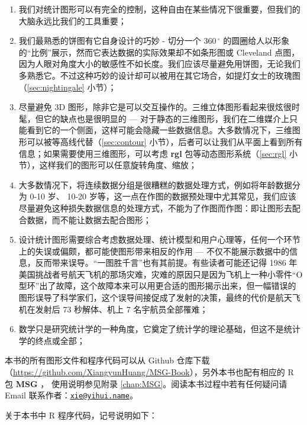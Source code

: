 \documentclass[
  b5paper,
  UTF8,twoside]{book}
\begin{document}
\begin{enumerate}
\def\labelenumi{\arabic{enumi}.}
\item
  我们对统计图形可以有完全的控制，这种自由在某些情况下很重要，但我们的大脑永远比我们的工具重要；
\item
  我们最熟悉的饼图有它自身设计的巧妙 - 切分一个 \(360\,^{\circ}\) 的圆圈给人以形象的``比例''展示，然而它表达数据的实际效果却不如条形图或 Cleveland 点图，因为人眼对角度大小的敏感性不如长度。我们应该尽量避免用饼图，无论我们多熟悉它。不过这种巧妙的设计却可以被用在其它场合，如提灯女士的玫瑰图（\ref{sec:nightingale} 小节）；
\item
  尽量避免 3D 图形，除非它是可以交互操作的。三维立体图形看起来很炫很时髦，但它的缺点也是很明显的 --- 对于静态的三维图形，我们在二维媒介上只能看到它的一个侧面，这样可能会隐藏一些数据信息。大多数情况下，三维图形可以被等高线代替（\ref{sec:contour} 小节），后者可以让我们从平面上看到所有信息；如果需要使用三维图形，可以考虑 \textbf{rgl} 包等动态图形系统（\ref{sec:rgl} 小节），这样我们的图形可以任意旋转角度、缩放；
\item
  大多数情况下，将连续数据分组是很糟糕的数据处理方式，例如将年龄数据分为 0-10 岁、 10-20 岁等，这一点在作图的数据预处理中尤其常见，我们应该尽量避免这种损失数据信息的处理方式，不能为了作图而作图：即让图形去配合数据，而不能让数据去配合图形；
\item
  设计统计图形需要综合考虑数据处理、统计模型和用户心理等，任何一个环节上的失误或偏颇，都可能使图形带来相反的作用 --- 不仅不能展示数据中的信息，反而带来误导。``一图胜千言''也有其前提。有些读者可能还记得 1986 年美国挑战者号航天飞机的那场灾难，灾难的原因只是因为飞机上一种小零件``O 型环''出了故障，这个故障本来可以用更合适的图形揭示出来，但一幅错误的图形误导了科学家们，这个误导间接促成了发射的决策，最终的代价是航天飞机在发射后 73 秒解体、机上 7 名宇航员全部罹难；
\item
  数学只是研究统计学的一种角度，它奠定了统计学的理论基础，但这不是统计学的终点或全部；
\end{enumerate}

本书的所有图形文件和程序代码可以从 Github 仓库下载（\url{https://github.com/XiangyunHuang/MSG-Book}），另外本书也配有相应的 R 包 \textbf{MSG} \citep{MSG}， 使用说明参见附录 \ref{chap:MSG}。阅读本书过程中若有任何疑问请 Email 联系作者：\href{mailto:xie@yihui.name}{\nolinkurl{xie@yihui.name}}。

关于本书中 R 程序代码，记号说明如下：
\end{document}

